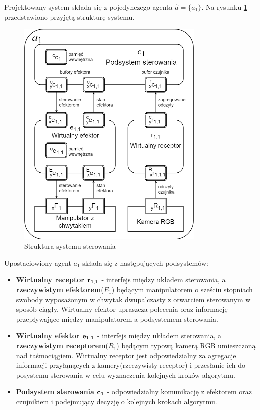 \documentclass{article}
\begin{document}
Projektowany system składa się z pojedynczego agenta $\hat{a} = \{a_1\}$. Na rysunku \ref{fig::struktura} przedstawiono przyjętą strukturę systemu.
\begin{figure}[H]
	\centering
	\includegraphics[width=0.8\textwidth]{struktura1.png}
	\caption{Struktura systemu sterowania}
	\label{fig::struktura}
\end{figure}
\noindent Upostaciowiony agent  $a_1$  składa się z następujących podsystemów:
\begin{itemize}
\item \textbf{Wirtualny receptor $\bold{r_{1,1}}$} - interfejs między układem sterowania, a \textbf{rzeczywistym efektorem}($E_1$) będącym manipulatorem o sze\'sciu stopniach swobody wyposażonym w chwytak dwupalczasty z otwarciem sterowanym w sposób ciągły. Wirtualny efektor upraszcza polecenia oraz informację przepływające między manipulatorem a podsystemem sterowania.
\item \textbf{Wirtualny efektor $\bold{e_{1,1}}$} - interfejs między układem sterowania, a \textbf{rzeczywistym receptorem}($R_1$) będącym typową kamerą RGB umieszczoną nad ta\'smociągiem. Wirtualny receptor jest odpowiedzialny za agregacje informacji przyłąnących z kamery(rzeczywisty receptor) i przesłanie ich do posystemu sterowania w celu wyznaczenia kolejnych kroków algorytmu.
\item \textbf{Podsystem sterowania $\bold{c_{1}}$} - odpowiedzialny komunikację z efektorem oraz czujnikiem i podejmujący decyzję o kolejnych krokach algorytmu.
\end{itemize}
\end{document}
